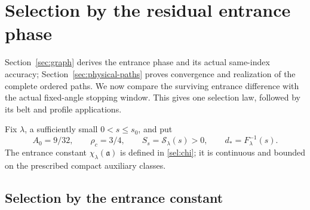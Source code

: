 \section{Selection by the residual entrance phase}
\label{sec:contact-selection}

Section~\ref{sec:graph} derives the entrance phase and its actual
same-index accuracy; Section~\ref{sec:physical-paths} proves convergence
and realization of the complete ordered paths. We now compare the
surviving entrance difference with the actual fixed-angle stopping
window. This gives one selection law, followed by its belt and profile
applications.

Fix $\lambda$, a sufficiently small $0<s\le s_0$, and put
\[
 A_0=9/32,\qquad \rho_c=3/4,\qquad
 S_s=\mathcal S_\lambda(s)>0,\qquad d_*=F_\lambda^{-1}(s).
\]
The entrance constant $\chi_\lambda(\mathfrak a)$ is defined in
\eqref{sel:chi}; it is continuous and bounded on the prescribed compact
auxiliary classes.

\subsection{Selection by the entrance constant}

